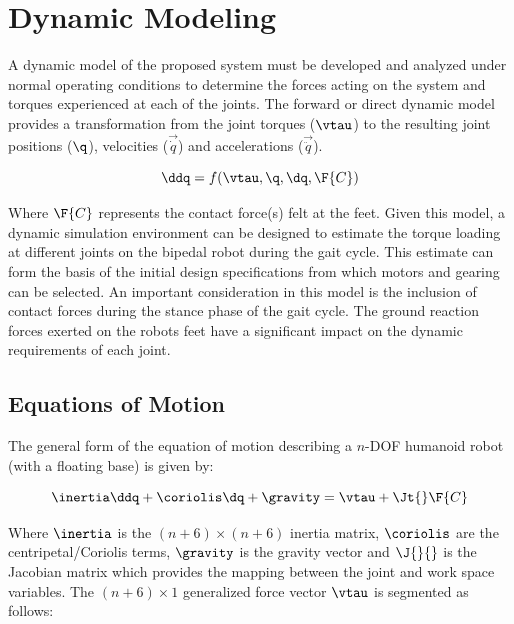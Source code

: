 
\section{Dynamic Modeling} %
\label{sec:designspec}

A dynamic model of the proposed system must be developed and analyzed under normal operating conditions to determine the forces acting on the system and torques experienced at each of the joints. The forward or direct dynamic model provides a transformation from the joint torques ($\vtau$) to the resulting joint positions ($\q$), velocities ($\vec{\dot{q}}$) and accelerations ($\vec{\ddot{q}}$).

\begin{equation}
	\ddq = f(\vtau, \q, \dq, \F{C})
\end{equation}

Where $\F{C}$ represents the contact force(s) felt at the feet. Given this model, a dynamic simulation environment can be designed to estimate the torque loading at different joints on the bipedal robot during the gait cycle. This estimate can form the basis of the initial design specifications from which motors and gearing can be selected. An important consideration in this model is the inclusion of contact forces during the stance phase of the gait cycle. The ground reaction forces exerted on the robots feet have a significant impact on the dynamic requirements of each joint.

\subsection{Equations of Motion} %
\label{sec:forward_dynamics}

The general form of the equation of motion describing a $n$-DOF humanoid robot (with a floating base) is given by: 

\begin{equation}
	\label{eq:eom1}
	\inertia \ddq + \coriolis \dq + \gravity = \vtau + \Jt{} \F{C}
\end{equation}

Where $\inertia$ is the $(n+6) \times (n+6)$ inertia matrix, $\coriolis$ are the centripetal/Coriolis terms, $\gravity$ is the gravity vector and $\J{}{}$ is the Jacobian matrix which provides the mapping between the joint and work space variables. The $(n+6) \times 1$ generalized force vector $\vtau$ is segmented as follows:

